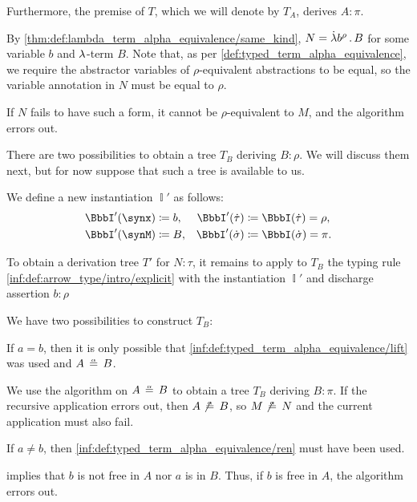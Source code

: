 \begin{algorithm}
\begin{thmenum}
    Furthermore, the premise of \( T \), which we will denote by \( T_A \), derives \( A: \pi \).

    By \cref{thm:def:lambda_term_alpha_equivalence/same_kind}, \( N = \qabs {b^\rho} B \) for some variable \( b \) and \( {\mathrm \lambda} \)-term \( B \). Note that, as per \cref{def:typed_term_alpha_equivalence}, we require the abstractor variables of \( \rho \)-equivalent abstractions to be equal, so the variable annotation in \( N \) must be equal to \( \rho \).

    If \( N \) fails to have such a form, it cannot be \( \rho \)-equivalent to \( M \), and the algorithm errors out.

    There are two possibilities to obtain a tree \( T_B \) deriving \( B: \rho \). We will discuss them next, but for now suppose that such a tree is available to us.

    We define a new instantiation \( \BbbI' \) as follows:
    \begin{align*}
      \BbbI'(\synx) &\coloneqq b, &\BbbI'(\syn\tau) &\coloneqq \BbbI(\syn\tau) = \rho, \\
      \BbbI'(\synM) &\coloneqq B, &\BbbI'(\syn\sigma) &\coloneqq \BbbI(\syn\sigma) = \pi.
    \end{align*}

    To obtain a derivation tree \( T' \) for \( N: \tau \), it remains to apply to \( T_B \) the typing rule \ref{inf:def:arrow_type/intro/explicit} with the instantiation \( \BbbI' \) and discharge assertion \( b: \rho \)

    We have two possibilities to construct \( T_B \):
    \begin{thmenum}
       If \( a = b \), then it is only possible that \ref{inf:def:typed_term_alpha_equivalence/lift} was used and \( A \aequiv B \).

      We use the algorithm on \( A \aequiv B \) to obtain a tree \( T_B \) deriving \( B: \pi \). If the recursive application errors out, then \( A \not\aequiv B \), so \( M \not\aequiv N \) and the current application must also fail.

       If \( a \neq b \), then \ref{inf:def:typed_term_alpha_equivalence/ren} must have been used.

       implies that \( b \) is not free in \( A \) nor \( a \) is in \( B \). Thus, if \( b \) is free in \( A \), the algorithm errors out.


\end{thmenum}
\end{thmenum}
\end{algorithm}
